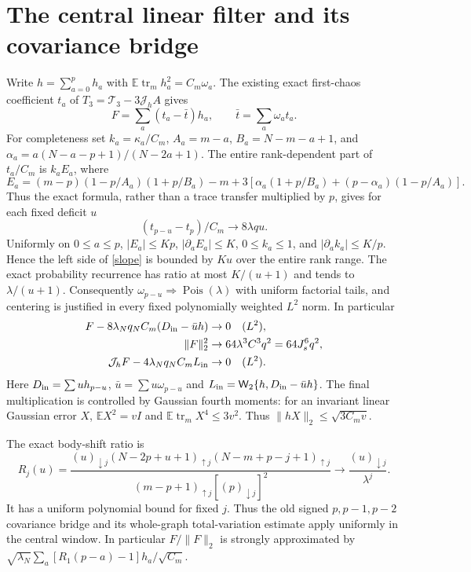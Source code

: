 \documentclass[11pt,a4paper]{article}
\newcommand{\EE}{\mathbb E}
\newcommand{\tr}{\operatorname{tr}}
\newcommand{\W}[1]{\mathsf W_{#1}}
\newcommand{\Jh}{\mathcal J_h}
\begin{document}
\newpage
\section{The central linear filter and its covariance bridge}
Write $h=\sum_{a=0}^p h_a$ with
$\EE\tr_m h_a^2=C_m\omega_a$. The existing exact first-chaos
coefficient $t_a$ of $T_3=\mathcal T_3-3\Jh A$ gives
\begin{equation}
 F=\sum_a(t_a-\bar t)h_a,\qquad \bar t=\sum_a\omega_a t_a.
\end{equation}
For completeness set $k_a=\kappa_a/C_m$, $A_a=m-a$,
$B_a=N-m-a+1$, and $\alpha_a=a(N-a-p+1)/(N-2a+1)$.
The entire rank-dependent part of $t_a/C_m$ is $k_a E_a$, where
\begin{equation}
 E_a=(m-p)(1-p/A_a)(1+p/B_a)-m
 +3[\alpha_a(1+p/B_a)+(p-\alpha_a)(1-p/A_a)].
\end{equation}
Thus the exact formula, rather than a trace transfer multiplied
by $p$, gives for each fixed deficit $u$
\begin{equation}
 (t_{p-u}-t_p)/C_m\to8\lambda q u.\label{slope}
\end{equation}
Uniformly on $0\leq a\leq p$, $|E_a|\leq Kp$,
$|\partial_a E_a|\leq K$, $0\leq k_a\leq1$,
and $|\partial_a k_a|\leq K/p$. Hence the left side of
\eqref{slope} is bounded by $Ku$ over the entire rank range.
The exact probability recurrence has ratio at most $K/(u+1)$
and tends to $\lambda/(u+1)$. Consequently
$\omega_{p-u}\Rightarrow\operatorname{Pois}(\lambda)$ with
uniform factorial tails, and centering is justified in every
fixed polynomially weighted $L^2$ norm. In particular
\begin{align}
 F-8\lambda_Nq_NC_m(D_{\rm in}-\bar u h)&\to0\quad(L^2),\\
 \|F\|_2^2&\to64\lambda^3C^3q^2=64J_s^6q^2,\label{VF}\\
 \Jh F-4\lambda_Nq_NC_m L_{\rm in}&\to0\quad(L^2).
\end{align}
Here $D_{\rm in}=\sum u h_{p-u}$,
$\bar u=\sum u\omega_{p-u}$ and
$L_{\rm in}=\W2\{h,D_{\rm in}-\bar u h\}$.
The final multiplication is controlled by Gaussian fourth moments:
for an invariant linear Gaussian error $X$, $\EE X^2=vI$ and
$\EE\tr_m X^4\leq3v^2$. Thus $\|hX\|_2\leq\sqrt{3C_m v}$.

The exact body-shift ratio is
\begin{equation}
 R_j(u)=\frac{(u)_{\downarrow j}(N-2p+u+1)_{\uparrow j}
 (N-m+p-j+1)_{\uparrow j}}
 {(m-p+1)_{\uparrow j}[(p)_{\downarrow j}]^2}
 \longrightarrow\frac{(u)_{\downarrow j}}{\lambda^j}.
\end{equation}
It has a uniform polynomial bound for fixed $j$. Thus the old
signed $p,p-1,p-2$ covariance bridge and its whole-graph
total-variation estimate apply uniformly in the central window.
In particular $F/\|F\|_2$ is strongly approximated by
$\sqrt{\lambda_N}\sum_a[R_1(p-a)-1]h_a/\sqrt{C_m}$.
\end{document}

